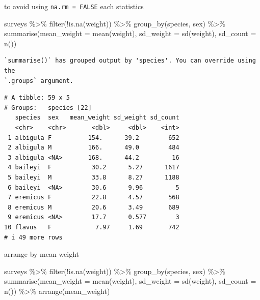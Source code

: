 \documentclass[
  letterpaper,
  DIV=11,
  numbers=noendperiod]{scrreprt}
\newenvironment{Shaded}{\begin{snugshade}}{\end{snugshade}}
\newcommand{\AttributeTok}[1]{\textcolor[rgb]{0.40,0.45,0.13}{#1}}
\newcommand{\FunctionTok}[1]{\textcolor[rgb]{0.28,0.35,0.67}{#1}}
\newcommand{\NormalTok}[1]{\textcolor[rgb]{0.00,0.23,0.31}{#1}}
\newcommand{\SpecialCharTok}[1]{\textcolor[rgb]{0.37,0.37,0.37}{#1}}
\begin{document}
to avoid using \texttt{na.rm\ =\ FALSE} each statistics

\begin{Shaded}
\begin{Highlighting}[]
\NormalTok{surveys }\SpecialCharTok{\%\textgreater{}\%}
  \FunctionTok{filter}\NormalTok{(}\SpecialCharTok{!}\FunctionTok{is.na}\NormalTok{(weight)) }\SpecialCharTok{\%\textgreater{}\%}
  \FunctionTok{group\_by}\NormalTok{(species, sex) }\SpecialCharTok{\%\textgreater{}\%}
  \FunctionTok{summarise}\NormalTok{(}\AttributeTok{mean\_weight =} \FunctionTok{mean}\NormalTok{(weight), }\AttributeTok{sd\_weight =} \FunctionTok{sd}\NormalTok{(weight), }\AttributeTok{sd\_count =} \FunctionTok{n}\NormalTok{())}
\end{Highlighting}
\end{Shaded}

\begin{verbatim}
`summarise()` has grouped output by 'species'. You can override using the
`.groups` argument.
\end{verbatim}

\begin{verbatim}
# A tibble: 59 x 5
# Groups:   species [22]
   species  sex   mean_weight sd_weight sd_count
   <chr>    <chr>       <dbl>     <dbl>    <int>
 1 albigula F          154.      39.2        652
 2 albigula M          166.      49.0        484
 3 albigula <NA>       168.      44.2         16
 4 baileyi  F           30.2      5.27      1617
 5 baileyi  M           33.8      8.27      1188
 6 baileyi  <NA>        30.6      9.96         5
 7 eremicus F           22.8      4.57       568
 8 eremicus M           20.6      3.49       689
 9 eremicus <NA>        17.7      0.577        3
10 flavus   F            7.97     1.69       742
# i 49 more rows
\end{verbatim}

arrange by mean weight

\begin{Shaded}
\begin{Highlighting}[]
\NormalTok{surveys }\SpecialCharTok{\%\textgreater{}\%}
  \FunctionTok{filter}\NormalTok{(}\SpecialCharTok{!}\FunctionTok{is.na}\NormalTok{(weight)) }\SpecialCharTok{\%\textgreater{}\%}
  \FunctionTok{group\_by}\NormalTok{(species, sex) }\SpecialCharTok{\%\textgreater{}\%}
  \FunctionTok{summarise}\NormalTok{(}\AttributeTok{mean\_weight =} \FunctionTok{mean}\NormalTok{(weight), }\AttributeTok{sd\_weight =} \FunctionTok{sd}\NormalTok{(weight), }\AttributeTok{sd\_count =} \FunctionTok{n}\NormalTok{()) }\SpecialCharTok{\%\textgreater{}\%}
  \FunctionTok{arrange}\NormalTok{(mean\_weight)}
\end{Highlighting}
\end{Shaded}
\end{document}
